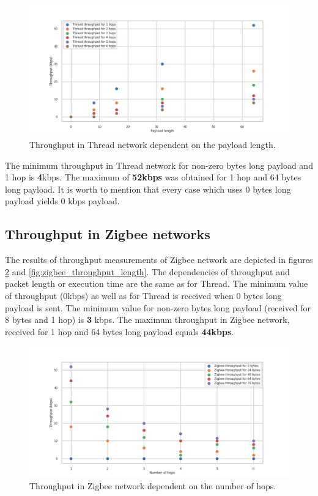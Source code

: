 \begin{figure}[H]
    \centering
    \includegraphics[scale=0.45]{images/Thread_Throughput_vs_length.png}
    \caption{Throughput in Thread network dependent on the payload length. }
    \label{fig:thread_throughput_length}
\end{figure}

The minimum throughput in Thread network for non-zero bytes long payload and 1 hop is \textbf{4}kbps. The maximum of \textbf{52kbps} was obtained
for 1 hop and 64 bytes long payload. It is worth to mention that every case which uses
0 bytes long payload yields 0 kbps payload.


\subsection{Throughput in Zigbee networks}

The results of throughput measurements of Zigbee network are depicted
in figures \ref{fig:zigbee_throughput_all} and \ref{fig:zigbee_throughput_length}. The dependencies of
throughput and packet length or execution time are the same as
for Thread. The minimum value of throughput (0kbps) as well as for
Thread is received when 0 bytes long payload is sent. The minimum value for non-zero bytes long payload (received for 8 bytes and 1 hop) is \textbf{3} kbps. The maximum
throughput in Zigbee network, received for 1 hop and 64 bytes long payload equals \textbf{44kbps}.


\begin{figure}[H]
    \centering
    \includegraphics[scale=0.45]{images/Zigbee_Throughput_all.png}
    \caption{Throughput in Zigbee network dependent on the number of hops.}
    \label{fig:zigbee_throughput_all}
\end{figure}

